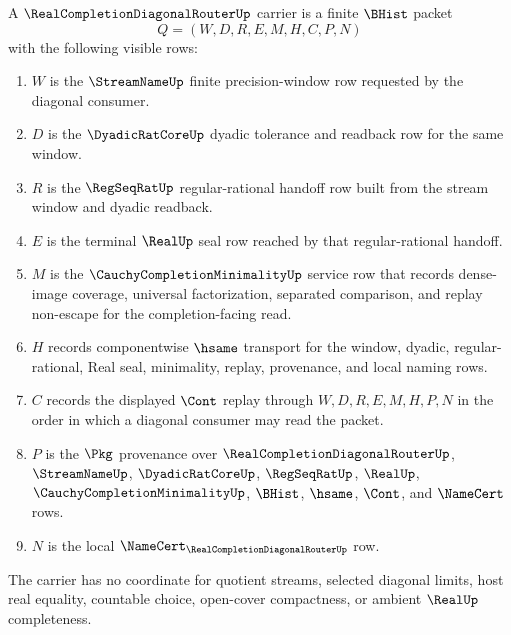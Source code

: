 \begin{definition}
\label{def:real-completion-diagonal-router-carrier}
A $\RealCompletionDiagonalRouterUp$ carrier is a finite $\BHist$ packet
$$
Q=(W,D,R,E,M,H,C,P,N)
$$
with the following visible rows:
\begin{enumerate}
\item $W$ is the $\StreamNameUp$ finite precision-window row requested by the diagonal consumer.
\item $D$ is the $\DyadicRatCoreUp$ dyadic tolerance and readback row for the same window.
\item $R$ is the $\RegSeqRatUp$ regular-rational handoff row built from the stream window and dyadic readback.
\item $E$ is the terminal $\RealUp$ seal row reached by that regular-rational handoff.
\item $M$ is the $\CauchyCompletionMinimalityUp$ service row that records dense-image coverage, universal factorization, separated comparison, and replay non-escape for the completion-facing read.
\item $H$ records componentwise $\hsame$ transport for the window, dyadic, regular-rational, Real seal, minimality, replay, provenance, and local naming rows.
\item $C$ records the displayed $\Cont$ replay through $W,D,R,E,M,H,P,N$ in the order in which a diagonal consumer may read the packet.
\item $P$ is the $\Pkg$ provenance over $\RealCompletionDiagonalRouterUp$, $\StreamNameUp$, $\DyadicRatCoreUp$, $\RegSeqRatUp$, $\RealUp$, $\CauchyCompletionMinimalityUp$, $\BHist$, $\hsame$, $\Cont$, and $\NameCert$ rows.
\item $N$ is the local $\NameCert_{\RealCompletionDiagonalRouterUp}$ row.
\end{enumerate}
The carrier has no coordinate for quotient streams, selected diagonal limits, host real equality, countable choice, open-cover compactness, or ambient $\RealUp$ completeness.
\end{definition}

